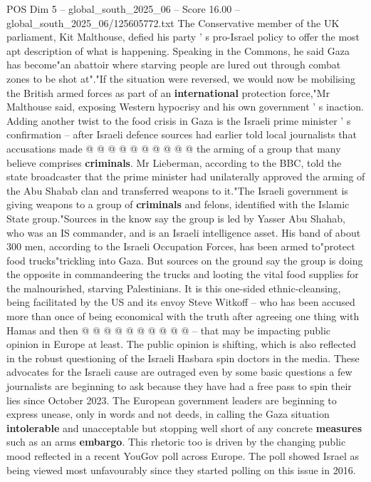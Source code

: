 \begin{textsample}{POS Dim 5 – global\_south\_2025\_06 – Score 16.00 – global\_south\_2025\_06/125605772.txt}
The Conservative member of the UK parliament, Kit Malthouse, defied his party ' s pro-Israel policy to offer the most apt description of what is happening.
Speaking in the Commons, he said Gaza has become"an abattoir where starving people are lured out through combat zones to be shot at"."If the situation were reversed, we would now be mobilising the British armed forces as part of an \textbf{international} protection force,"Mr Malthouse said, exposing Western hypocrisy and his own government ' s inaction.
Adding another twist to the food crisis in Gaza is the Israeli prime minister ' s confirmation -- after Israeli defence sources had earlier told local journalists that accusations made @ @ @ @ @ @ @ @ @ @ the arming of a group that many believe comprises \textbf{criminals}.
Mr Lieberman, according to the BBC, told the state broadcaster that the prime minister had unilaterally approved the arming of the Abu Shabab clan and transferred weapons to it."The Israeli government is giving weapons to a group of \textbf{criminals} and felons, identified with the Islamic State group."Sources in the know say the group is led by Yasser Abu Shahab, who was an IS commander, and is an Israeli intelligence asset.
His band of about 300 men, according to the Israeli Occupation Forces, has been armed to"protect food trucks"trickling into Gaza.
But sources on the ground say the group is doing the opposite in commandeering the trucks and looting the vital food supplies for the malnourished, starving Palestinians.
It is this one-sided ethnic-cleansing, being facilitated by the US and its envoy Steve Witkoff -- who has been accused more than once of being economical with the truth after agreeing one thing with Hamas and then @ @ @ @ @ @ @ @ @ @ -- that may be impacting public opinion in Europe at least.
The public opinion is shifting, which is also reflected in the robust questioning of the Israeli Hasbara spin doctors in the media.
These advocates for the Israeli cause are outraged even by some basic questions a few journalists are beginning to ask because they have had a free pass to spin their lies since October 2023.
The European government leaders are beginning to express unease, only in words and not deeds, in calling the Gaza situation \textbf{intolerable} and unacceptable but stopping well short of any concrete \textbf{measures} such as an arms \textbf{embargo}.
This rhetoric too is driven by the changing public mood reflected in a recent YouGov poll across Europe.
The poll showed Israel as being viewed most unfavourably since they started polling on this issue in 2016.

\end{textsample}
